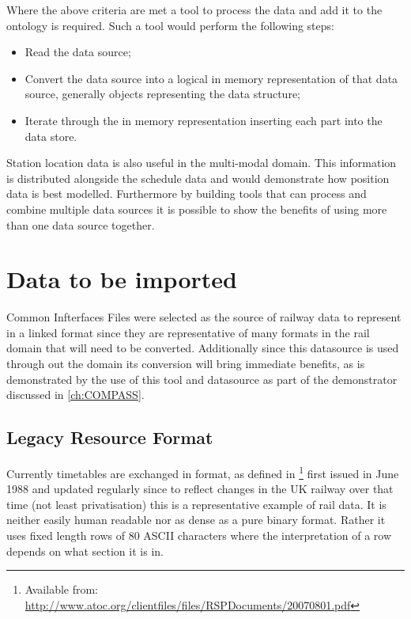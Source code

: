 Where the above criteria are met a tool to process the data and add it to the ontology is required. Such a tool would perform the following steps:

 \begin{itemize}
	\item Read the data source;
	\item Convert the data source into a logical in memory representation of that data source, generally objects representing the data structure;
	\item Iterate through the in memory representation inserting each part into the data store.
\end{itemize}

Station location data is also useful in the multi-modal domain. This information is distributed alongside the schedule data and would demonstrate how position data is best modelled. Furthermore by building tools that can process and combine multiple data sources it is possible to show the benefits of using more than one data source together. 

\section{Data to be imported}

Common Infterfaces Files were selected as the source of railway data to represent in a linked format since they are representative of many formats in the rail domain that will need to be converted. Additionally since this datasource is used through out the domain its conversion will bring immediate benefits, as is demonstrated by the use of this tool and datasource as part of the demonstrator discussed in \autoref{ch:COMPASS}. 

\subsection{Legacy Resource Format}
\label{sec:datatoimport}
Currently timetables are exchanged in  format, as defined in \citep{nr2007}\footnote{Available from: \url{http://www.atoc.org/clientfiles/files/RSPDocuments/20070801.pdf}} first issued in June 1988 and updated regularly since to reflect changes in the UK railway over that time (not least privatisation) this is a representative example of rail data. It is neither easily human readable nor as dense as a pure binary format. Rather it uses fixed length rows of 80 ASCII characters where the interpretation of a row depends on what section it is in.

